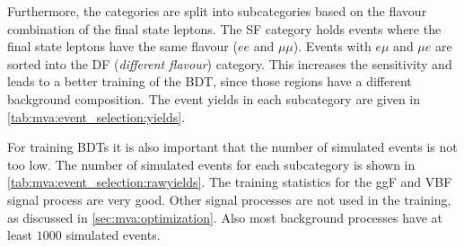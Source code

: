 
Furthermore, the categories are split into subcategories based on the flavour combination of the final state leptons.
The SF category holds events where the final state leptons have the same flavour ($ee$ and $\mu\mu$).
Events with $e\mu$ and $\mu e$ are sorted into the DF (\emph{different flavour}) category.
This increases the sensitivity and leads to a better training of the BDT, since those regions have a different background composition.
The event yields in each subcategory are given in \cref{tab:mva:event_selection:yields}.

For training BDTs it is also important that the number of simulated events is not too low.
The number of simulated events for each subcategory is shown in \cref{tab:mva:event_selection:rawyields}.
The training statistics for the ggF and VBF signal process are very good.
Other signal processes are not used in the training, as discussed in \cref{sec:mva:optimization}.
Also most background processes have at least $1000$ simulated events.

